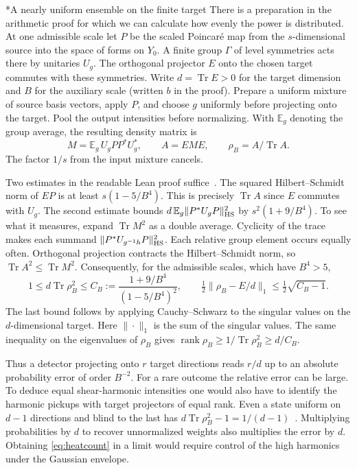 \documentclass[11pt,letterpaper]{article}
\makeatletter
\renewcommand\subsection{\@startsection{subsection}{2}{\z@}{-2.0ex plus -.3ex}{.75ex}{\normalfont\normalsize\itshape}}
\newcommand{\Tr}{\operatorname{Tr}}
\numberwithin{equation}{section}
\makeatother
\begin{document}
\subsection*{A nearly uniform ensemble on the finite target}\label{app:target-ensemble}
There is a preparation in the arithmetic proof for which we can calculate how evenly the power is distributed. At one admissible scale let $P$ be the scaled Poincar\'e map from the $s$-dimensional source into the space of forms on $Y_0$. A finite group $\Gamma$ of level symmetries acts there by unitaries $U_g$. The orthogonal projector $E$ onto the chosen target commutes with these symmetries. Write $d=\Tr E>0$ for the target dimension and $B$ for the auxiliary scale (written $b$ in the proof). Prepare a uniform mixture of source basis vectors, apply $P$, and choose $g$ uniformly before projecting onto the target. Pool the output intensities before normalizing. With $\mathbb E_g$ denoting the group average, the resulting density matrix is
\[
 M=\mathbb E_g\,U_gPP^*U_g^*,\qquad A=EME,\qquad
 \rho_B=A/\Tr A .
\]
The factor $1/s$ from the input mixture cancels.

Two estimates in the readable Lean proof suffice~\cite{ensemblelean}. The squared Hilbert--Schmidt norm of $EP$ is at least $s(1-5/B^4)$. This is precisely $\Tr A$ since $E$ commutes with $U_g$. The second estimate bounds $d\,\mathbb E_g\|P^*U_gP\|_{\rm HS}^2$ by $s^2(1+9/B^4)$. To see what it measures, expand $\Tr M^2$ as a double average. Cyclicity of the trace makes each summand $\|P^*U_{g^{-1}h}P\|_{\rm HS}^2$. Each relative group element occurs equally often. Orthogonal projection contracts the Hilbert--Schmidt norm, so $\Tr A^2\le\Tr M^2$. Consequently, for the admissible scales, which have $B^4>5$,
\[
 1\le d\Tr\rho_B^2\le C_B:=\frac{1+9/B^4}{(1-5/B^4)^2},
 \qquad \tfrac12\|\rho_B-E/d\|_1\le \tfrac12\sqrt{C_B-1}.
\]
The last bound follows by applying Cauchy--Schwarz to the singular values on the $d$-dimensional target. Here $\|\cdot\|_1$ is the sum of the singular values. The same inequality on the eigenvalues of $\rho_B$ gives $\operatorname{rank}\rho_B\ge 1/\Tr\rho_B^2\ge d/C_B$.

Thus a detector projecting onto $r$ target directions reads $r/d$ up to an absolute probability error of order $B^{-2}$. For a rare outcome the relative error can be large. To deduce equal shear-harmonic intensities one would also have to identify the harmonic pickups with target projectors of equal rank. Even a state uniform on $d-1$ directions and blind to the last has $d\Tr\rho_B^2-1=1/(d-1)$~\cite{zhangperiods,primeguide}. Multiplying probabilities by $d$ to recover unnormalized weights also multiplies the error by $d$. Obtaining \eqref{eq:heatcount} in a limit would require control of the high harmonics under the Gaussian envelope.
\end{document}
